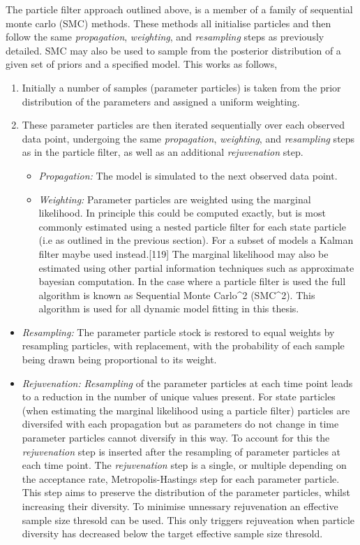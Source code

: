 \documentclass[11pt,twoside]{bristolthesis}
\begin{document}
  The particle filter approach outlined above, is a member of a family of sequential monte carlo (SMC) methods. These methods all initialise particles and then follow the same \emph{propagation}, \emph{weighting}, and \emph{resampling} steps as previously detailed. SMC may also be used to sample from the posterior distribution of a given set of priors and a specified model. This works as follows,
  \begin{enumerate}
  \def\labelenumi{\arabic{enumi}.}
  \item
    Initially a number of samples (parameter particles) is taken from the prior distribution of the parameters and assigned a uniform weighting.
  \item
    These parameter particles are then iterated sequentially over each observed data point, undergoing the same \emph{propagation}, \emph{weighting}, and \emph{resampling} steps as in the particle filter, as well as an additional \emph{rejuvenation} step.
    \begin{itemize}
    \item
      \emph{Propagation:} The model is simulated to the next observed data point.
    \item
      \emph{Weighting:} Parameter particles are weighted using the marginal likelihood. In principle this could be computed exactly, but is most commonly estimated using a nested particle filter for each state particle (i.e as outlined in the previous section). For a subset of models a Kalman filter maybe used instead.{[}119{]} The marginal likelihood may also be estimated using other partial information techniques such as approximate bayesian computation. In the case where a particle filter is used the full algorithm is known as Sequential Monte Carlo\^{}2 (SMC\^{}2). This algorithm is used for all dynamic model fitting in this thesis.
    \end{itemize}
  \end{enumerate}
  \begin{itemize}
  \item
    \emph{Resampling:} The parameter particle stock is restored to equal weights by resampling particles, with replacement, with the probability of each sample being drawn being proportional to its weight.
  \item
    \emph{Rejuvenation:} \emph{Resampling} of the parameter particles at each time point leads to a reduction in the number of unique values present. For state particles (when estimating the marginal likelihood using a particle filter) particles are diversifed with each propagation but as parameters do not change in time parameter particles cannot diversify in this way. To account for this the \emph{rejuvenation} step is inserted after the resampling of parameter particles at each time point. The \emph{rejuvenation} step is a single, or multiple depending on the acceptance rate, Metropolis-Hastings step for each parameter particle. This step aims to preserve the distribution of the parameter particles, whilst increasing their diversity. To minimise unnessary rejuvenation an effective sample size thresold can be used. This only triggers rejuveation when particle diversity has decreased below the target effective sample size thresold.
  \end{itemize}
\end{document}
